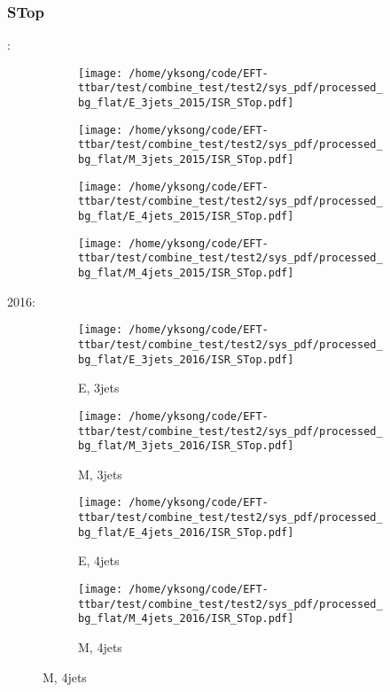 \documentclass{beamer}
\begin{document}
\begin{frame}
\frametitle{STop}
\fontsize{5}{1}:
\begin{figure}
\centering
\begin{subfigure}[b]{0.24\textwidth}
\texttt{[image: /home/yksong/code/EFT-ttbar/test/combine\_test/test2/sys\_pdf/processed\_bg\_flat/E\_3jets\_2015/ISR\_STop.pdf]}
\end{subfigure}
\begin{subfigure}[b]{0.24\textwidth}
\texttt{[image: /home/yksong/code/EFT-ttbar/test/combine\_test/test2/sys\_pdf/processed\_bg\_flat/M\_3jets\_2015/ISR\_STop.pdf]}
\end{subfigure}
\begin{subfigure}[b]{0.24\textwidth}
\texttt{[image: /home/yksong/code/EFT-ttbar/test/combine\_test/test2/sys\_pdf/processed\_bg\_flat/E\_4jets\_2015/ISR\_STop.pdf]}
\end{subfigure}
\begin{subfigure}[b]{0.24\textwidth}
\texttt{[image: /home/yksong/code/EFT-ttbar/test/combine\_test/test2/sys\_pdf/processed\_bg\_flat/M\_4jets\_2015/ISR\_STop.pdf]}
\end{subfigure}
\end{figure}
2016:
\begin{figure}
\centering
\begin{subfigure}[b]{0.24\textwidth}
\texttt{[image: /home/yksong/code/EFT-ttbar/test/combine\_test/test2/sys\_pdf/processed\_bg\_flat/E\_3jets\_2016/ISR\_STop.pdf]}
\captionsetup{font=tiny}
\caption{E, 3jets}
\end{subfigure}
\begin{subfigure}[b]{0.24\textwidth}
\texttt{[image: /home/yksong/code/EFT-ttbar/test/combine\_test/test2/sys\_pdf/processed\_bg\_flat/M\_3jets\_2016/ISR\_STop.pdf]}
\captionsetup{font=tiny}
\caption{M, 3jets}
\end{subfigure}
\begin{subfigure}[b]{0.24\textwidth}
\texttt{[image: /home/yksong/code/EFT-ttbar/test/combine\_test/test2/sys\_pdf/processed\_bg\_flat/E\_4jets\_2016/ISR\_STop.pdf]}
\captionsetup{font=tiny}
\caption{E, 4jets}
\end{subfigure}
\begin{subfigure}[b]{0.24\textwidth}
\texttt{[image: /home/yksong/code/EFT-ttbar/test/combine\_test/test2/sys\_pdf/processed\_bg\_flat/M\_4jets\_2016/ISR\_STop.pdf]}
\captionsetup{font=tiny}
\caption{M, 4jets}
\end{subfigure}
\end{figure}
\end{frame}
\end{document}
